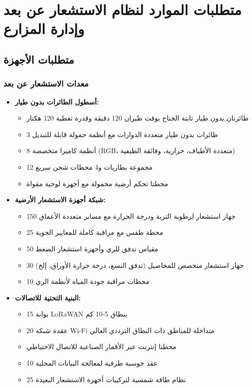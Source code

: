 \section{متطلبات الموارد لنظام الاستشعار عن بعد وإدارة المزارع}

\subsection{متطلبات الأجهزة}

\subsubsection{معدات الاستشعار عن بعد}
\begin{itemize}
    \item \textbf{أسطول الطائرات بدون طيار:}
    \begin{itemize}
        \item طائرتان بدون طيار ثابتة الجناح بوقت طيران 120 دقيقة وقدرة تغطية 120 هكتار
        \item 3 طائرات بدون طيار متعددة الدوارات مع أنظمة حمولة قابلة للتبديل
        \item 8 أنظمة كاميرا متخصصة (RGB، متعددة الأطياف، حرارية، وفائقة الطيفية)
        \item 12 مجموعة بطاريات و4 محطات شحن سريع
        \item محطتا تحكم أرضية محمولة مع أجهزة لوحية مقواة
    \end{itemize}
    
    \item \textbf{شبكة أجهزة الاستشعار الأرضية:}
    \begin{itemize}
        \item 150 جهاز استشعار لرطوبة التربة ودرجة الحرارة مع مسابر متعددة الأعماق
        \item 25 محطة طقس مع مراقبة كاملة للمعايير الجوية
        \item 50 مقياس تدفق للري وأجهزة استشعار الضغط
        \item 30 جهاز استشعار متخصص للمحاصيل (تدفق النسغ، درجة حرارة الأوراق، إلخ)
        \item 10 محطات مراقبة جودة المياه لأنظمة الري
    \end{itemize}
    
    \item \textbf{البنية التحتية للاتصالات:}
    \begin{itemize}
        \item 15 بوابة LoRaWAN بنطاق 5-10 كم
        \item 20 عقدة شبكة Wi-Fi متداخلة للمناطق ذات النطاق الترددي العالي
        \item محطتا إنترنت عبر الأقمار الصناعية للاتصال الاحتياطي
        \item 10 عقد حوسبة طرفية لمعالجة البيانات المحلية
        \item 25 نظام طاقة شمسية لتركيبات أجهزة الاستشعار البعيدة
    \end{itemize}
\end{itemize}

